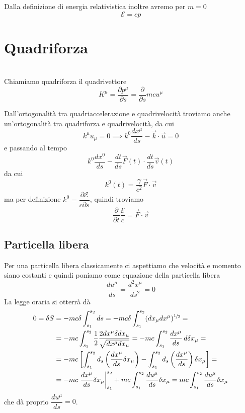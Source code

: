 \documentclass[12pt,a4paper,titlepage, twoside, openright]{book}
\newenvironment{definizione}[1][\empty]{\begin{Definizione}{
\ifx\empty#1\relax\else\mdseries\itshape#1\\\fi
}{}}{\end{Definizione}}
\numberwithin{equation}{chapter}
\begin{document}
Dalla definizione di energia relativistica inoltre avremo per $m=0$
\[
\mathcal{E}=cp
\]

\section{Quadriforza}
\begin{definizione}
Chiamiamo quadriforza il quadrivettore
\[
K^\mu=\dfrac{\partial p^\mu}{\partial s}=\dfrac{\partial}{\partial s}mcu^\mu
\]
\end{definizione}
Dall'ortogonalità tra quadriaccelerazione e quadrivelocità troviamo anche un'ortogonalità tra quadriforza e quadrivelocità, da cui
\[
k^\mu u_\mu=0\implies k^0\dfrac{dx^\mu}{ds}-\vec{k}\cdot\vec{u}=0
\]
e passando al tempo
\[
k^0 \dfrac{dx^0}{ds} - \dfrac{dt}{ds}\vec{F}(t)\cdot \dfrac{dt}{ds} \vec{v}(t)
\]
da cui
\begin{equation}
k^0(t)=\dfrac{\gamma}{c^2} \vec{F}\cdot \vec{v}
\end{equation}
ma per definizione $k^0=\dfrac{\partial \mathcal{E}}{c\partial s}$, quindi troviamo
\begin{equation}
\dfrac{\partial}{\partial t}\dfrac{\mathcal{E}}{c} = \vec{F}\cdot\vec{v}
\end{equation}

\subsection{Particella libera}
Per una particella libera classicamente ci aspettiamo che velocità e momento siano costanti e quindi poniamo come equazione della particella libera
\[
\dfrac{d u^\mu}{d s}=\dfrac{d^2 x^\mu}{d s^2}=0
\]
La legge oraria si otterrà dà
\begin{align*}
0=\delta S &= -mc \delta\int_{s_1}^{s_2} ds = -mc\delta\int_{s_1}^{s_2}  (dx_\mu dx^\mu)^{\sfrac{1}{2}} = \\
&= -mc\int_{s_1}^{s_2} \dfrac{1}{2}\dfrac{2dx^\mu \delta dx_\mu}{\sqrt{dx^\mu dx_\mu}} = -mc\int_{s_1}^{s_2} \dfrac{dx^\mu}{ds}\, d\delta x_\mu = \\
& = -mc \left[ \int_{s_1}^{s_2} d_s\left( \dfrac{dx^\mu}{ds} \delta x_\mu\right) -\int_{s_1}^{s_2} d_s\left( \dfrac{dx^\mu}{ds} \right) \delta x_\mu \right] = \\
&= -mc\left.\dfrac{dx^\mu}{ds}\delta x_\mu \right|_{s_1}^{s_2} + mc \int_{s_1}^{s_2} \dfrac{du^\mu}{ds} \delta x_\mu =  mc \int_{s_1}^{s_2} \dfrac{du^\mu}{ds} \delta x_\mu 
\end{align*}
che dà proprio $\dfrac{d u^\mu}{ds}=0$.
\end{document}
